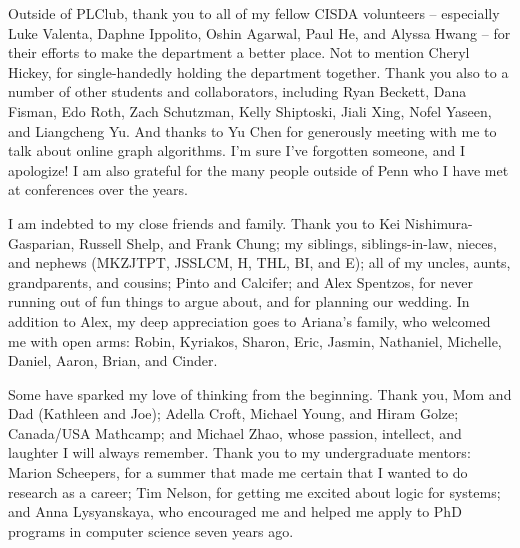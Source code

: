 Outside of PLClub, thank you to all of my fellow CISDA volunteers -- especially Luke Valenta, Daphne Ippolito, Oshin Agarwal, Paul He, and Alyssa Hwang -- for their efforts to make the department a better place.
Not to mention Cheryl Hickey, for single-handedly holding the department together.
Thank you also to a number of other students and collaborators, including Ryan Beckett, Dana Fisman, Edo Roth, Zach Schutzman, Kelly Shiptoski, Jiali Xing, Nofel Yaseen, and Liangcheng Yu.
And thanks to Yu Chen for generously meeting with me to talk about online graph algorithms.
I'm sure I've forgotten someone, and I apologize!
I am also grateful for the many people outside of Penn who I have met at conferences over the years.

I am indebted to my close friends and family. Thank you to Kei Nishimura-Gasparian, Russell Shelp, and Frank Chung; my siblings, siblings-in-law, nieces, and nephews (MKZJTPT, JSSLCM, H, THL, BI, and E); all of my uncles, aunts, grandparents, and cousins; Pinto and Calcifer; and Alex Spentzos, for never running out of fun things to argue about, and for planning our wedding. In addition to Alex, my deep appreciation goes to Ariana's family, who welcomed me with open arms: Robin, Kyriakos, Sharon, Eric, Jasmin, Nathaniel, Michelle, Daniel, Aaron, Brian, and Cinder.

Some have sparked my love of thinking from the beginning.
Thank you, Mom and Dad (Kathleen and Joe);
Adella Croft, Michael Young, and Hiram Golze;
Canada/USA Mathcamp;
and Michael Zhao,
whose passion, intellect, and laughter I will always remember.
Thank you to my undergraduate mentors: Marion Scheepers, for a summer that made me certain that I wanted to do research as a career;
Tim Nelson, for getting me excited about logic for systems;
and Anna Lysyanskaya, who encouraged me and helped me apply to PhD programs in computer science seven years ago.
